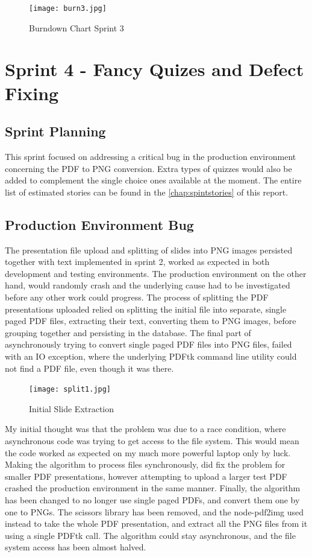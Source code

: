 \begin{figure}[h!]
    \centering
    \texttt{[image: burn3.jpg]}
    \caption{Burndown Chart Sprint 3}
    \label{fig:burn3}
\end{figure}

\newpage
\section{Sprint 4 - Fancy Quizes and Defect Fixing}
\subsection{Sprint Planning}
This sprint focused on addressing a critical bug in the production environment
concerning the PDF to PNG conversion. Extra types of quizzes would also be added
to complement the single choice ones available at the moment. The entire list of estimated stories
can be found in the \autoref{chap:spintstories} of this report.

\subsection{Production Environment Bug}
The presentation file upload and splitting of slides into PNG images persisted
together with text implemented in sprint 2, worked as expected in both development and testing environments.
The production environment on the other hand, would randomly crash and the underlying cause had
to be investigated before any other work could progress. The process of splitting the
PDF presentations uploaded relied on splitting the initial file into separate, single
paged PDF files, extracting their text, converting them to PNG images, before grouping
together and persisting in the database. The final part of asynchronously trying
to convert single paged PDF files into PNG files, failed with an IO exception, where
the underlying PDFtk\cite{55} command line utility could not find a PDF file, even though it was
there.

\begin{figure}[h!]
    \centering
    \texttt{[image: split1.jpg]}
    \caption{Initial Slide Extraction}
    \label{fig:split1}
\end{figure}

\newpage
My initial thought was that the problem was due to a race condition, where asynchronous
code was trying to get access to the file system. This would mean the code worked as expected
on my much more powerful laptop only by luck. Making the algorithm to process
files synchronously, did fix the problem for smaller PDF presentations, however attempting
to upload a larger test PDF crashed the production environment in the same manner.
Finally, the algorithm has been changed to no longer use single paged PDFs, and convert them
one by one to PNGs. The scissors library has been removed, and the node-pdf2img\cite{56} used
instead to take the whole PDF presentation, and extract all the PNG files from it using a
single PDFtk call. The algorithm could stay asynchronous, and the file system access has been almost halved.

